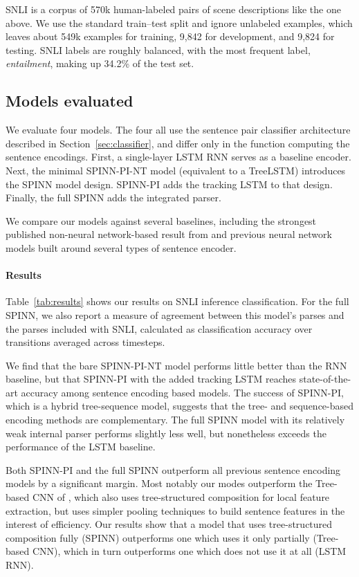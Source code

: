 \documentclass[11pt]{article}
\begin{document}
SNLI is a corpus of 570k human-labeled pairs of scene descriptions like the one above. We use the standard train--test split and ignore unlabeled examples, which leaves about 549k examples for training, 9,842 for development, and 9,824 for testing. SNLI labels are roughly balanced, with the most frequent label, {\it entailment}, making up 34.2\% of the test set.

\subsection{Models evaluated}

We evaluate four models. The four all use the sentence pair classifier architecture described in Section~\ref{sec:classifier}, and differ only in the function computing the sentence encodings. First, a single-layer LSTM RNN \citep[similar to that of][]{snli:emnlp2015} serves as a baseline encoder. Next, the minimal SPINN-PI-NT model (equivalent to a TreeLSTM) introduces the SPINN model design. SPINN-PI adds the tracking LSTM to that design. Finally, the full SPINN adds the integrated parser.

We compare our models against several baselines, including the strongest published non-neural network-based result from \citet{snli:emnlp2015} and previous neural network models built around several types of sentence encoder.

\paragraph{Results} Table~\ref{tab:results} shows our results on SNLI inference classification. For the full SPINN, we also report a measure of agreement between this model's parses and the parses included with SNLI, calculated as classification accuracy over transitions averaged across timesteps.

We find that the bare SPINN-PI-NT model performs little better than the RNN baseline, but that SPINN-PI with the added tracking LSTM reaches state-of-the-art accuracy among sentence encoding based models. The success of SPINN-PI, which is a hybrid tree-sequence model, suggests that the tree- and sequence-based encoding methods are complementary. The full SPINN model with its relatively weak internal parser performs slightly less well, but nonetheless exceeds the performance of the LSTM baseline.

Both SPINN-PI and the full SPINN outperform all previous sentence encoding models by a significant margin. Most notably our modes outperform the Tree-based CNN of \citet{mou2015recognizing}, which also uses tree-structured composition for local feature extraction, but uses simpler pooling techniques to build sentence features in the interest of efficiency. Our results show that a model that uses tree-structured composition fully (SPINN) outperforms one which uses it only partially (Tree-based CNN), which in turn outperforms one which does not use it at all (LSTM RNN).
\end{document}
